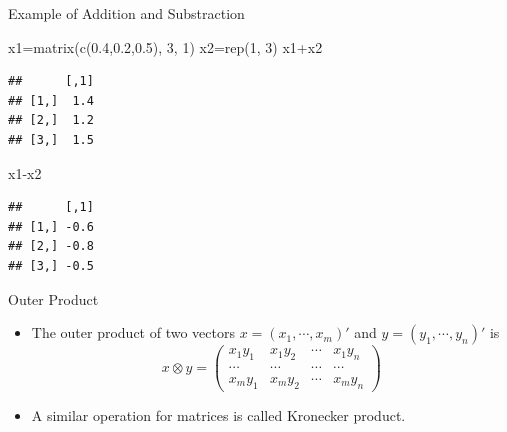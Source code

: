 \documentclass[
  ignorenonframetext,
]{beamer}
\newenvironment{Shaded}{\begin{snugshade}}{\end{snugshade}}
\newcommand{\DecValTok}[1]{\textcolor[rgb]{0.00,0.00,0.81}{#1}}
\newcommand{\FloatTok}[1]{\textcolor[rgb]{0.00,0.00,0.81}{#1}}
\newcommand{\FunctionTok}[1]{\textcolor[rgb]{0.00,0.00,0.00}{#1}}
\newcommand{\NormalTok}[1]{#1}
\newcommand{\OtherTok}[1]{\textcolor[rgb]{0.56,0.35,0.01}{#1}}
\newcommand{\SpecialCharTok}[1]{\textcolor[rgb]{0.00,0.00,0.00}{#1}}
\providecommand{\tightlist}{%
  \setlength{\itemsep}{0pt}\setlength{\parskip}{0pt}}
\begin{document}
\begin{frame}[fragile]{Example of Addition and Substraction}
\protect\hypertarget{example-of-addition-and-substraction}{}
\begin{Shaded}
\begin{Highlighting}[]
\NormalTok{x1}\OtherTok{=}\FunctionTok{matrix}\NormalTok{(}\FunctionTok{c}\NormalTok{(}\FloatTok{0.4}\NormalTok{,}\FloatTok{0.2}\NormalTok{,}\FloatTok{0.5}\NormalTok{), }\DecValTok{3}\NormalTok{, }\DecValTok{1}\NormalTok{)}
\NormalTok{x2}\OtherTok{=}\FunctionTok{rep}\NormalTok{(}\DecValTok{1}\NormalTok{, }\DecValTok{3}\NormalTok{)}
\NormalTok{x1}\SpecialCharTok{+}\NormalTok{x2}
\end{Highlighting}
\end{Shaded}

\begin{verbatim}
##      [,1]
## [1,]  1.4
## [2,]  1.2
## [3,]  1.5
\end{verbatim}

\begin{Shaded}
\begin{Highlighting}[]
\NormalTok{x1}\SpecialCharTok{{-}}\NormalTok{x2}
\end{Highlighting}
\end{Shaded}

\begin{verbatim}
##      [,1]
## [1,] -0.6
## [2,] -0.8
## [3,] -0.5
\end{verbatim}
\end{frame}

\begin{frame}{Outer Product}
\protect\hypertarget{outer-product}{}
\begin{itemize}
\tightlist
\item
  The outer product of two vectors \(x=(x_1,\cdots, x_m)'\) and
  \(y=(y_1,\cdots,y_n)'\) is \[x\otimes y= \begin{pmatrix}
  x_1y_1 & x_1y_2 & \cdots & x_1y_n\\
  \cdots& \cdots& \cdots& \cdots \\
  x_my_1 & x_my_2 & \cdots & x_my_n
  \end{pmatrix}\]
\item
  A similar operation for matrices is called Kronecker product.
\end{itemize}
\end{frame}
\end{document}
